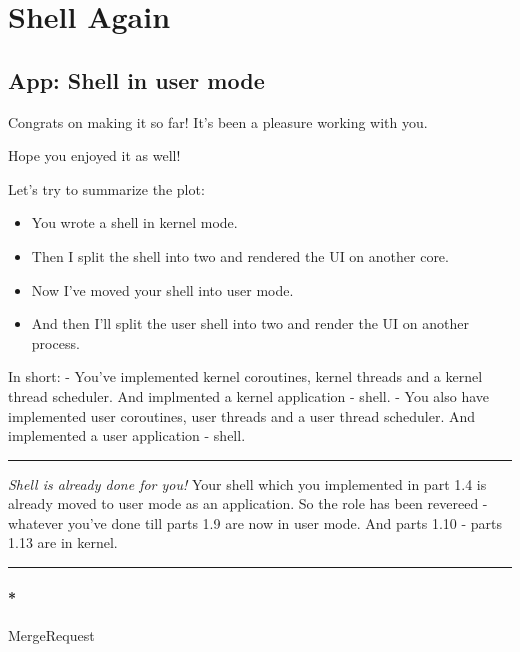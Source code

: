 \documentclass[]{article}
\providecommand{\tightlist}{%
  \setlength{\itemsep}{0pt}\setlength{\parskip}{0pt}}
\let\oldparagraph\paragraph
\renewcommand{\paragraph}[1]{\oldparagraph{#1}\mbox{}}
\begin{document}
\section{Shell Again}\label{shell-again}

\subsection*{App: Shell in user mode}\label{app-shell-in-user-mode}

Congrats on making it so far! It's been a pleasure working with you.

Hope you enjoyed it as well!

Let's try to summarize the plot:

\begin{itemize}
\tightlist
\item
  You wrote a shell in kernel mode.
\item
  Then I split the shell into two and rendered the UI on another core.
\item
  Now I've moved your shell into user mode.
\item
  And then I'll split the user shell into two and render the UI on
  another process.
\end{itemize}

In short: - You've implemented kernel coroutines, kernel threads and a
kernel thread scheduler. And implmented a kernel application - shell. -
You also have implemented user coroutines, user threads and a user
thread scheduler. And implemented a user application - shell.

\begin{center}\rule{0.5\linewidth}{\linethickness}\end{center}

\emph{Shell is already done for you!} Your shell which you implemented
in part 1.4 is already moved to user mode as an application. So the role
has been revereed - whatever you've done till parts 1.9 are now in user
mode. And parts 1.10 - parts 1.13 are in kernel.

\begin{center}\rule{0.5\linewidth}{\linethickness}\end{center}

\paragraph*{MergeRequest}\label{mergerequest-14}
\end{document}

